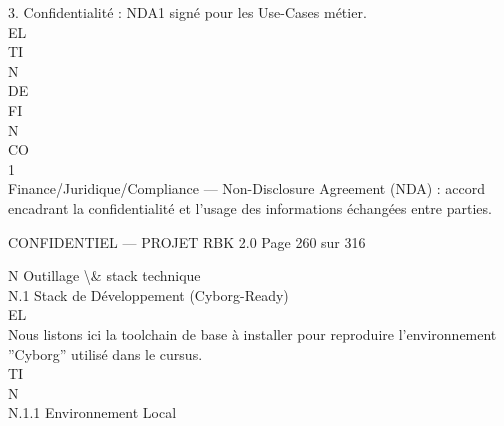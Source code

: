 \vspace{0.5em}
3. Confidentialité : NDA1 signé pour les Use-Cases métier.\\
\vspace{0.5em}
\vspace{0.5em}
\vspace{0.5em}
\vspace{0.5em}
EL\\
TI\\
N\\
DE\\
FI\\
N\\
CO\\
\vspace{0.5em}
\vspace{0.5em}
\vspace{0.5em}
\vspace{0.5em}
1\\
Finance/Juridique/Compliance — Non-Disclosure Agreement (NDA) : accord encadrant la confidentialité et l’usage des informations échangées entre parties.\\
\vspace{0.5em}
\vspace{0.5em}
\begin{confidential}CONFIDENTIEL — PROJET RBK 2.0                                            Page 260 sur 316\end{confidential}
N \textbar{} Outillage \textbackslash{}& stack technique\\
\vspace{0.5em}
\vspace{0.5em}
N.1 Stack de Développement (Cyborg-Ready)\\
\vspace{0.5em}
\vspace{0.5em}
\vspace{0.5em}
\vspace{0.5em}
EL\\
Nous listons ici la toolchain de base à installer pour reproduire l’environnement ”Cyborg” utilisé dans le cursus.\\
\vspace{0.5em}
\vspace{0.5em}
\vspace{0.5em}
\vspace{0.5em}
TI\\
N\\
N.1.1 Environnement Local\\
\vspace{0.5em}
